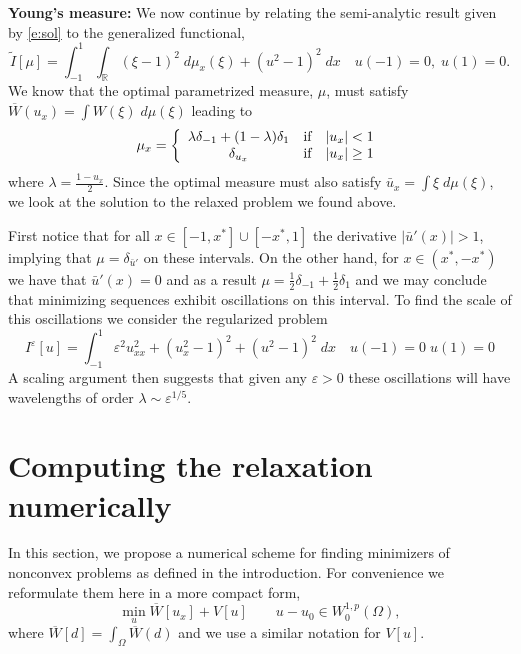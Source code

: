 \documentclass[11pt]{article}
\newcommand{\eps}{\varepsilon}
\newcommand{\R}{\mathbb{R}}
\theoremstyle{plain}
\begin{document}
{\bf Young's measure:} We now continue by relating the semi-analytic result given by \eqref{e:sol} to the generalized functional,
\[ \tilde{I}[\mu] = \int_{-1}^1 \int_\R (\xi -1)^2 \;d\mu_x(\xi) + (u^2-1)^2\;dx \quad u(-1) =0,\; u(1) =0.\]
We know that the optimal parametrized measure, $\mu$, must satisfy $\overline{W}(u_x) = \int W(\xi) \;d\mu(\xi)$ leading to
\[ \mu_x = \left \{ \begin{array}{c c c}
\lambda \delta_{-1}+ (1-\lambda) \delta_{1} & \mbox{if} & |u_x| < 1\\
\delta_{u_x} & \mbox{if} & |u_x|\geq 1
\end{array} \right. \]
where $\lambda = \frac{ 1- u_x}{2}$. Since the optimal measure must also satisfy  $\bar{u}_x = \int \xi \;d\mu(\xi)$, we look at the solution to the relaxed problem we found above.

First notice that for all $ x\in [-1,x^*] \cup [-x^*,1]$ the derivative $|\bar{u}'(x)| >1$, implying that  $\mu= \delta_{\bar{u}'}$ on these intervals. On the other hand, for $ x\in (x^*,-x^*)$ we have that $\bar{u}'(x) =0$ and as a result $\mu = \frac{1}{2} \delta_{-1} + \frac{1}{2} \delta_{1}$ and we may conclude that minimizing sequences exhibit oscillations on this interval. To find the scale of this oscillations we consider the regularized problem 
\[ I^\eps[u] = \int_{-1}^1 \eps^2 u_{xx}^2 + (u_x^2-1)^2 + (u^2-1)^2\;dx \quad u(-1) = 0 \; u(1) = 0\]
A scaling argument then suggests that given any $\eps>0$ these oscillations will have wavelengths of order $\lambda \sim \eps^{1/5}$. 



 
 

\section{Computing the relaxation numerically}\label{s:computations}
In this section, we propose a numerical scheme for finding minimizers of nonconvex problems as defined in the introduction. For convenience we reformulate them here in a more compact form,
\begin{equation}\label{e:relaxed}
 \min_{u}  \overline{W}[u_x] + V[u] \qquad u-u_0 \in W^{1,p}_0(\Omega),
 \end{equation}
where  $\overline{W}[d] = \int_\Omega \overline{W}(d)$ and we use a similar notation for $V[u]$. 
\end{document}
